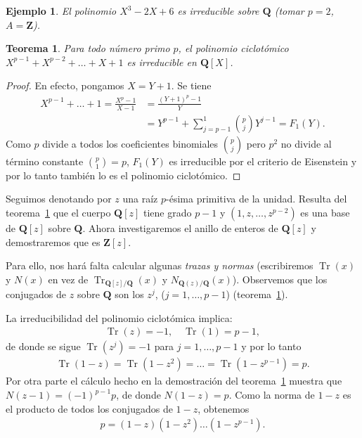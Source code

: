 \documentclass[10pt,oneside,bibtotoc,smallheadings,leqno,a5paper,DIV=12]{scrbook}
\newcommand{\QQ}{\mathbf{Q}}
\newcommand{\ZZ}{\mathbf{Z}}
\newcommand{\QED}{}%
\DeclareMathOperator{\Tr}{Tr}
\numberwithin{equation}{section}
\theoremstyle{defi}
\theoremstyle{enonce}
\newtheorem{theorem}{Teorema}
\theoremstyle{rem}
\newtheorem*{example*}{Ejemplo}
\numberwithin{theorem}{section}
\numberwithin{proposition}{section}
\numberwithin{definition}{section}
\numberwithin{lemma}{section}
\numberwithin{corollary}{section}
\numberwithin{example}{section}
\numberwithin{footnote}{section}%
\begin{document}
\begin{example*}
El polinomio $X^{3}-2X+6$ es irreducible sobre $\QQ$ (tomar $p=2$, $A=\ZZ$).
\end{example*}

\begin{theorem}\label{teo2.9.1}
Para todo n\'umero primo $p$, el polinomio ciclot\'omico $X^{p-1}+X^{p-2}+\dots+X+1$ es irreducible
en $\QQ[X]$.
\end{theorem}

\begin{proof}
En efecto, pongamos $X = Y+1$. Se tiene
\begin{align*}
X^{p-1}+\dots+1 = \frac{X^{p}-1}{X-1} &= \frac{(Y+1)^{p}-1}{Y}\\
&=Y^{p-1}+\sum_{j=p-1}^{1}\binom{p}{j}Y^{j-1}=F_{1}(Y).
\end{align*}
Como $p$ divide a todos los coeficientes binomiales $\binom{p}{j}$ pero $p^{2}$ no divide al
t\'ermino constante $\binom{p}{1} = p$, $F_{1}(Y)$ es irreducible por el criterio de Eisenstein y
por lo tanto tambi\'en lo es el polinomio ciclot\'omico. \QED
\end{proof}

Seguimos denotando por $z$ una ra\'iz $p$-\'esima primitiva de la unidad. Resulta del
teorema~\ref{teo2.9.1} que el cuerpo
$\QQ[z]$ tiene grado $p-1$ y $(1,z,\dots,z^{p-2})$ es una base de  $\QQ[z]$ sobre $\QQ$. Ahora investigaremos el
anillo de enteros de $\QQ[z]$ y demostraremos que es $\ZZ[z]$.

Para ello, nos har\'a falta calcular algunas {\em trazas y normas} (escribiremos $\Tr(x)$ y $N(x)$ en vez
de $\Tr_{\QQ[z]/\QQ}(x)$ y $N_{\QQ(z)/\QQ}(x)$). Observemos que los conjugados de $z$ sobre $\QQ$ son los
$z^{j}$, ($j=1,\dots,p-1$) (teorema~\ref{teo2.9.1}).

La irreducibilidad del polinomio ciclot\'omica implica:
\begin{gather}\label{eq-2.9-1}
\Tr(z) = -1,\quad\Tr(1)=p-1,
\end{gather}
de donde se sigue $\Tr(z^{j}) = -1$ para $j=1,\dots,p-1$ y por lo tanto
\begin{gather}\label{eq-2.9-2}
\Tr(1-z) = \Tr(1-z^{2})=\dots=\Tr(1-z^{p-1}) = p.
\end{gather}
Por otra parte el c\'alculo hecho en la demostraci\'on del teorema~\ref{teo2.9.1} muestra que $N(z-1)=(-1)^{p-1}p$, de donde
$N(1-z)=p$. Como la norma de $1-z$ es el producto de todos los conjugados de $1-z$, obtenemos
\begin{gather}\label{eq-2.9-3}
p=(1-z)(1-z^{2})\dots(1-z^{p-1}).
\end{gather}
\end{document}
